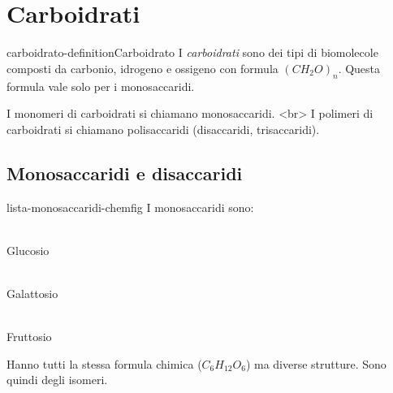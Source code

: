 \documentclass[preview]{standalone}
\begin{document}
\genpage

\section{Carboidrati}

\begin{snippetdefinition}{carboidrato-definition}{Carboidrato}
    I \textit{carboidrati} sono dei tipi di biomolecole composti da carbonio, idrogeno e ossigeno
    con formula \((CH_2O)_n\). Questa formula vale solo per i monosaccaridi.
\end{snippetdefinition}

\begin{plainhtml}
    I monomeri di carboidrati si chiamano monosaccaridi. <br> I polimeri di carboidrati si chiamano polisaccaridi (disaccaridi, trisaccaridi).
\end{plainhtml}

\subsection{Monosaccaridi e disaccaridi}

\begin{snippet}{lista-monosaccaridi-chemfig}
    I monosaccaridi sono:\\
    \phantom{}

    \begin{minipage}{0.2\textwidth}
        \centering
         \phantom{}\\
        \hspace*{0.5cm} Glucosio
    \end{minipage}
    \hspace{3cm}
    \begin{minipage}{0.2\textwidth}
        \centering
         \phantom{}\\
            \hspace*{0.5cm} Galattosio
    \end{minipage}
    \hspace{3cm}
    \begin{minipage}{0.2\textwidth}
        \centering
         \phantom{}\\
            \hspace*{-0.5cm} Fruttosio
    \end{minipage}
    \vspace{1cm}

    Hanno tutti la stessa formula chimica (\(C_{6}H_{12}O_{6}\)) ma diverse strutture. Sono quindi degli isomeri.
\end{snippet}
\end{document}
